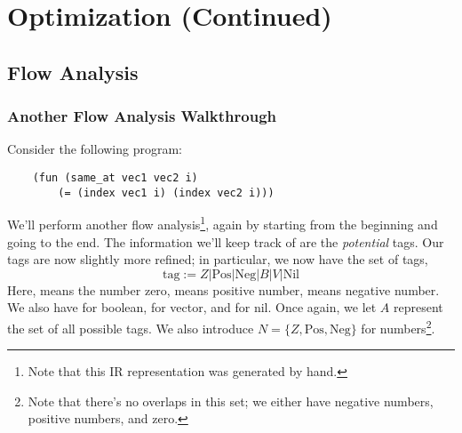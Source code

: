 \documentclass[letterpaper]{article}
\begin{document}
\thispagestyle{noheader}
\section{Optimization (Continued)}
\subsection{Flow Analysis}
\subsubsection{Another Flow Analysis Walkthrough}
Consider the following program: 
\begin{verbatim}
    (fun (same_at vec1 vec2 i)
        (= (index vec1 i) (index vec2 i)))\end{verbatim}
We'll perform another flow analysis\footnote{Note that this IR representation was generated by hand.}, again by starting from the beginning and going to the end. The information we'll keep track of are the \emph{potential} tags. Our tags are now slightly more refined; in particular, we now have the set of tags, 
\[\text{tag} := Z | \text{Pos} | \text{Neg} | B | V | \text{Nil}\]
Here,  means the number zero,  means positive number,  means negative number. We also have  for boolean,  for vector, and  for nil. Once again, we let $A$ represent the set of all possible tags. We also introduce $N = \{Z, \text{Pos}, \text{Neg}\}$ for numbers\footnote{Note that there's no overlaps in this set; we either have negative numbers, positive numbers, and zero.}. 
\end{document}
